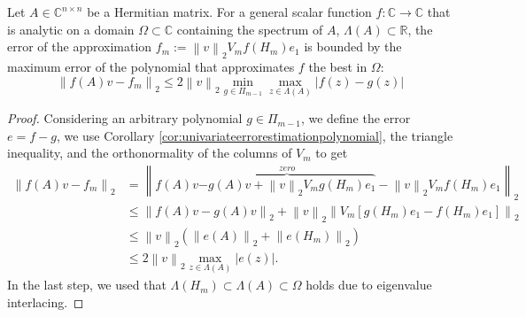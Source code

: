 \begin{theorem}
    \label{the:univariateerrorestimationgeneral}
    Let $A \in \mathbb{C}^{n \times n}$ be a Hermitian matrix. For a general scalar
    function $f: \mathbb{C} \to \mathbb{C}$ that is analytic on a domain
    $\Omega \subset \mathbb{C}$ containing the spectrum of $A$,
    $\Lambda(A) \subset \mathbb{R}$, the error of the approximation
    $f_m := \left\| v \right\|_{2} V_m f(H_m) e_1$ is bounded by the maximum error
    of the polynomial that approximates $f$ the best in $\Omega$:
    \begin{equation}
        \label{eq:univariateerrorestimationgeneral}
        \left\| f(A)v - f_m \right\|_2 \le
        2 \left\| v \right\|_2 \min_{g \in \Pi_{m-1}}
        \max_{z \in \Lambda(A)} \left|f(z) - g(z) \right|
    \end{equation}
\end{theorem}
\begin{proof}
    Considering an arbitrary polynomial $g \in \Pi_{m-1}$, we define the error
    $e = f - g$, we use Corollary \ref{cor:univariateerrorestimationpolynomial},
    the triangle inequality, and the orthonormality of the columns of $V_m$ to get
    \begin{equation*}
        \begin{aligned}
            \left\| f(A)v - f_m \right\|_2
                & = \left\| f(A)v \overset{zero}{\overbrace{- g(A)v + \left\| v \right\|_{2} V_m g(H_m) e_1}}
                - \left\| v \right\|_{2} V_m f(H_m) e_1 \right\|_2 \\
            & \le \left\| f(A)v - g(A)v \right\|_{2}
                + \left\| v \right\|_{2}
                \left\| V_m [g(H_m) e_1 - f(H_m) e_1] \right\|_2\\
            & \le \left\| v \right\|_2 \left( \left\| e(A) \right\|_2 + \left\| e(H_m) \right\|_2 \right)\\
            & \le 2 \left\| v \right\|_2 \max_{z \in \Lambda(A)} \left| e(z) \right|.
            \end{aligned}
    \end{equation*}
    In the last step, we used that $\Lambda(H_m) \subset \Lambda(A) \subset \Omega$
    holds due to eigenvalue interlacing.
\end{proof}

